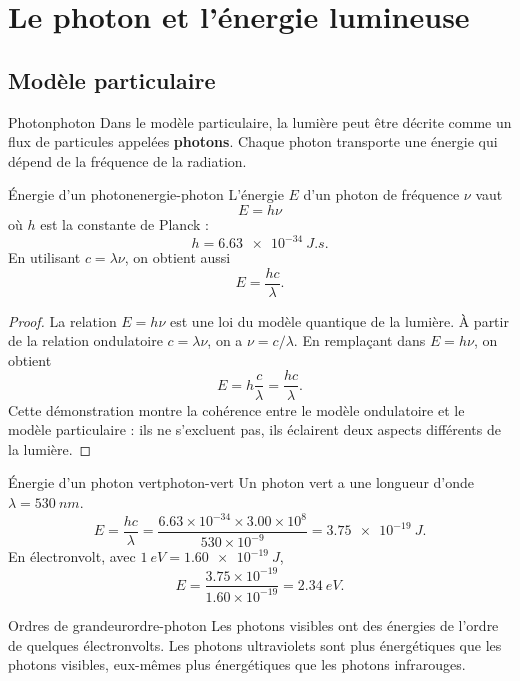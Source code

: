 \documentclass[11pt,a4paper]{article}
\begin{document}
\section{Le photon et l'énergie lumineuse}

\subsection{Modèle particulaire}

\begin{definitionbox}{Photon}{photon}
Dans le modèle particulaire, la lumière peut être décrite comme un flux de particules appelées \textbf{photons}. Chaque photon transporte une énergie qui dépend de la fréquence de la radiation.
\end{definitionbox}

\begin{theorembox}{Énergie d'un photon}{energie-photon}
L'énergie $E$ d'un photon de fréquence $\nu$ vaut
\[
\boxed{E=h\nu}
\]
où $h$ est la constante de Planck :
\[
h=\SI{6.63e-34}{J.s}.
\]
En utilisant $c=\lambda\nu$, on obtient aussi
\[
\boxed{E=\frac{hc}{\lambda}}.
\]
\end{theorembox}

\begin{proof}
La relation $E=h\nu$ est une loi du modèle quantique de la lumière. À partir de la relation ondulatoire $c=\lambda\nu$, on a $\nu=c/\lambda$. En remplaçant dans $E=h\nu$, on obtient
\[
E=h\frac{c}{\lambda}=\frac{hc}{\lambda}.
\]
Cette démonstration montre la cohérence entre le modèle ondulatoire et le modèle particulaire : ils ne s'excluent pas, ils éclairent deux aspects différents de la lumière.
\end{proof}

\begin{examplebox}{Énergie d'un photon vert}{photon-vert}
Un photon vert a une longueur d'onde $\lambda=\SI{530}{nm}$.
\[
E=\frac{hc}{\lambda}=\frac{6.63\times 10^{-34}\times 3.00\times 10^8}{530\times 10^{-9}}=\SI{3.75e-19}{J}.
\]
En électronvolt, avec $\SI{1}{eV}=\SI{1.60e-19}{J}$,
\[
E=\frac{3.75\times 10^{-19}}{1.60\times 10^{-19}}=\SI{2.34}{eV}.
\]
\end{examplebox}

\begin{retenirbox}{Ordres de grandeur}{ordre-photon}
Les photons visibles ont des énergies de l'ordre de quelques électronvolts. Les photons ultraviolets sont plus énergétiques que les photons visibles, eux-mêmes plus énergétiques que les photons infrarouges.
\end{retenirbox}
\end{document}
